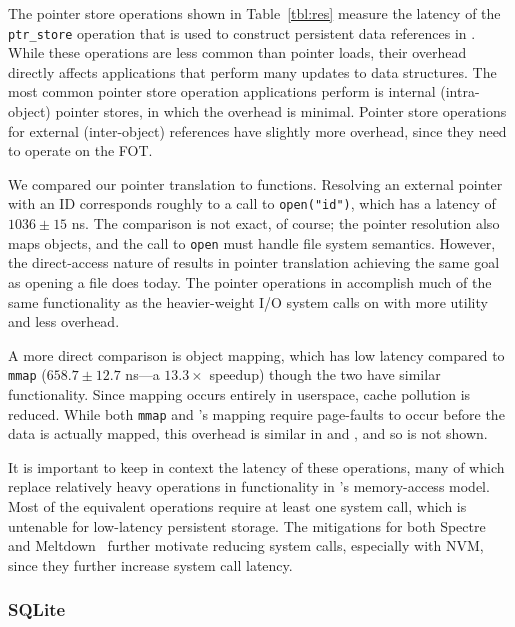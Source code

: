 The pointer store operations shown in Table~\ref{tbl:res} measure the latency of the
\texttt{ptr\_store} operation that is used to construct persistent data references in \Twizzler.
While these operations are less common than pointer loads, their overhead directly affects
applications that perform many updates to data structures.
The most common pointer store operation applications perform is internal (intra-object) pointer stores, in which the
overhead is minimal. Pointer store operations for external (inter-object) references have slightly
more overhead, since they need to operate on the FOT.



We compared our pointer translation to \unix functions.
Resolving an external pointer with an ID corresponds roughly
to a call to \texttt{open("id")}, which has a latency of $1036 \pm 15$ ns.
The comparison is not exact, of course; the pointer resolution
also maps objects, and the call to \texttt{open} must handle file system
semantics. However, the direct-access nature of \NVM results in pointer translation
achieving the same goal as opening a file does today. The pointer operations in \Twizzler accomplish
much of the same functionality as the heavier-weight I/O system calls on \unix with more utility and
less overhead.

A more direct comparison is object mapping, which has
low latency compared to \texttt{mmap} ($658.7 \pm 12.7$ ns---a $13.3\times$ speedup) though the two have similar
functionality. Since mapping occurs entirely
in userspace, cache pollution is reduced.
While both \texttt{mmap} and \Twizzler's mapping require
page-faults to occur before the data is actually mapped,
this overhead is similar in \Twizzler and \unix, and so is not
shown.


It is important to keep in context the latency of these operations, many of which
replace relatively heavy \unix operations in functionality in \Twizzler's memory-access
model. Most of the equivalent \unix operations require
at least one system call, which is untenable for low-latency persistent
storage.
The mitigations for both Spectre~\cite{spectre} and
Meltdown~\cite{meltdown} further motivate reducing system calls, especially with
NVM, since they further increase system call latency.


\subsubsection{SQLite}

